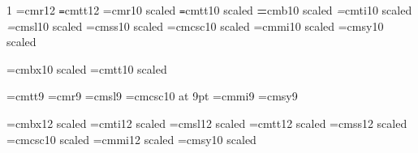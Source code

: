 \begin{\parsearg\beginxxx}


\newfam\sffam
\def\sf{\fam=\sffam \tensf}
\let\li = \sf %

\let\mainmagstep=\magstephalf

\def\setfont#1#2{\font#1=\fontprefix#2}

\ifx\fontprefix\undefined
\def\fontprefix{cm}
\fi

\ifx\bigger\relax
\let\mainmagstep=\magstep1
\setfont\textrm{r12}
\setfont\texttt{tt12}
\else
\setfont\textrm{r10 scaled \mainmagstep}
\setfont\texttt{tt10 scaled \mainmagstep}
\fi
\setfont\textbf{b10 scaled \mainmagstep}
\setfont\textit{ti10 scaled \mainmagstep}
\setfont\textsl{sl10 scaled \mainmagstep}
\setfont\textsf{ss10 scaled \mainmagstep}
\setfont\textsc{csc10 scaled \mainmagstep}
\font\texti=cmmi10 scaled \mainmagstep
\font\textsy=cmsy10 scaled \mainmagstep

\setfont{}{bx10 scaled } %
\setfont{}{tt10 scaled }
\def\df{\let\tentt=\deftt \let\tenbf = \defbf \bf}

\setfont\ninett{tt9}
\setfont\indrm{r9}
\setfont\indit{sl9}
\let\indsl=\indit
\let\indtt=\ninett
\let\indsf=\indrm
\let\indbf=\indrm
\setfont\indsc{csc10 at 9pt}
\font\indi=cmmi9
\font\indsy=cmsy9

\setfont\chaprm{bx12 scaled }
\setfont\chapit{ti12 scaled }
\setfont\chapsl{sl12 scaled }
\setfont\chaptt{tt12 scaled }
\setfont\chapsf{ss12 scaled }
\let\chapbf=\chaprm
\setfont\chapsc{csc10 scaled}
\font\chapi=cmmi12 scaled 
\font\chapsy=cmsy10 scaled 


\end{\parsearg\beginxxx}
